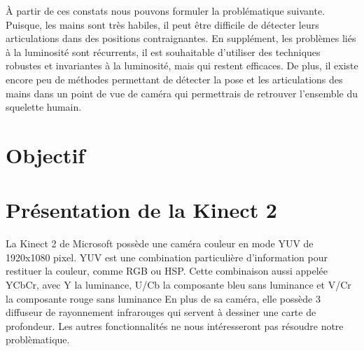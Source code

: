 À partir de ces constats nous pouvons formuler la problématique 
suivante. Puisque, 
les mains sont très habiles, il peut être difficile de détecter leurs 
articulations dans des positions contraignantes. En supplément, les 
problèmes liés à la luminosité sont récurrents, il est souhaitable 
d'utiliser des techniques robustes et invariantes à la luminosité, 
mais qui restent efficaces. De plus, il existe encore peu de méthodes 
permettant de détecter la pose et les articulations des mains dans 
un point de vue de caméra qui permettrais de retrouver l'ensemble du
squelette humain.

\section{Objectif}
%
%
%
%

\section{Présentation de la Kinect 2}
La Kinect 2 de Microsoft possède une caméra couleur en mode YUV de 1920x1080 pixel.
YUV est une combination particulière d'information pour restituer la couleur, comme RGB ou HSP.
Cette combinaison aussi appelée YCbCr, avec Y la luminance, U/Cb la composante bleu sans luminance et V/Cr la composante rouge sans luminance
En plus de sa caméra, elle possède 3 diffuseur de rayonnement infrarouges qui servent à dessiner une carte de profondeur.
Les autres fonctionnalités ne nous intéresseront pas résoudre notre problèmatique.\\

